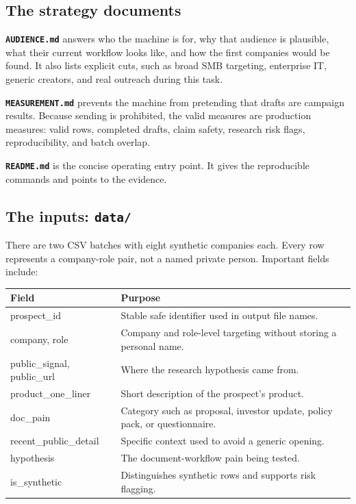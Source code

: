 \documentclass[11pt,a4paper]{article}
\newcommand{\pathcode}[1]{\texttt{#1}}
\begin{document}
\subsection{The strategy documents}

\textbf{\pathcode{AUDIENCE.md}} answers who the machine is for, why that audience is plausible, what their current workflow looks like, and how the first companies would be found. It also lists explicit cuts, such as broad SMB targeting, enterprise IT, generic creators, and real outreach during this task.

\textbf{\pathcode{MEASUREMENT.md}} prevents the machine from pretending that drafts are campaign results. Because sending is prohibited, the valid measures are production measures: valid rows, completed drafts, claim safety, research risk flags, reproducibility, and batch overlap.

\textbf{\pathcode{README.md}} is the concise operating entry point. It gives the reproducible commands and points to the evidence.

\subsection{The inputs: \pathcode{data/}}

There are two CSV batches with eight synthetic companies each. Every row represents a company-role pair, not a named private person. Important fields include:

\begin{tabularx}{\textwidth}{>{\ttfamily}p{} X}
\toprule
\normalfont\textbf{Field} & \textbf{Purpose} \\
\midrule
prospect\_id & Stable safe identifier used in output file names. \\
company, role & Company and role-level targeting without storing a personal name. \\
public\_signal, public\_url & Where the research hypothesis came from. \\
product\_one\_liner & Short description of the prospect's product. \\
doc\_pain & Category such as proposal, investor update, policy pack, or questionnaire. \\
recent\_public\_detail & Specific context used to avoid a generic opening. \\
hypothesis & The document-workflow pain being tested. \\
is\_synthetic & Distinguishes synthetic rows and supports risk flagging. \\
\bottomrule
\end{tabularx}
\end{document}
